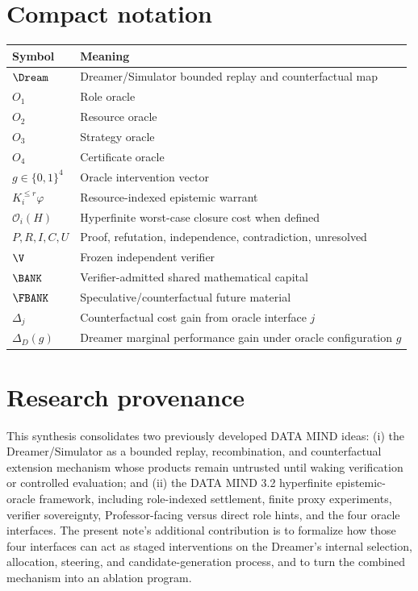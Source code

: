 \appendix
\section{Compact notation}

\begin{center}
\begin{tabular}{p{}p{}}
\toprule
Symbol & Meaning \\
\midrule
$\Dream$ & Dreamer/Simulator bounded replay and counterfactual map \\
$O_1$ & Role oracle \\
$O_2$ & Resource oracle \\
$O_3$ & Strategy oracle \\
$O_4$ & Certificate oracle \\
$g\in\{0,1\}^4$ & Oracle intervention vector \\
$K_i^{\le r}\varphi$ & Resource-indexed epistemic warrant \\
$\mathcal O_i(H)$ & Hyperfinite worst-case closure cost when defined \\
$P,R,I,C,U$ & Proof, refutation, independence, contradiction, unresolved \\
$\V$ & Frozen independent verifier \\
$\BANK$ & Verifier-admitted shared mathematical capital \\
$\FBANK$ & Speculative/counterfactual future material \\
$\Delta_j$ & Counterfactual cost gain from oracle interface $j$ \\
$\Delta_D(g)$ & Dreamer marginal performance gain under oracle configuration $g$ \\
\bottomrule
\end{tabular}
\end{center}

\section{Research provenance}

This synthesis consolidates two previously developed DATA MIND ideas: (i) the Dreamer/Simulator as a bounded replay, recombination, and counterfactual extension mechanism whose products remain untrusted until waking verification or controlled evaluation; and (ii) the DATA MIND 3.2 hyperfinite epistemic-oracle framework, including role-indexed settlement, finite proxy experiments, verifier sovereignty, Professor-facing versus direct role hints, and the four oracle interfaces. The present note's additional contribution is to formalize how those four interfaces can act as staged interventions on the Dreamer's internal selection, allocation, steering, and candidate-generation process, and to turn the combined mechanism into an ablation program.


